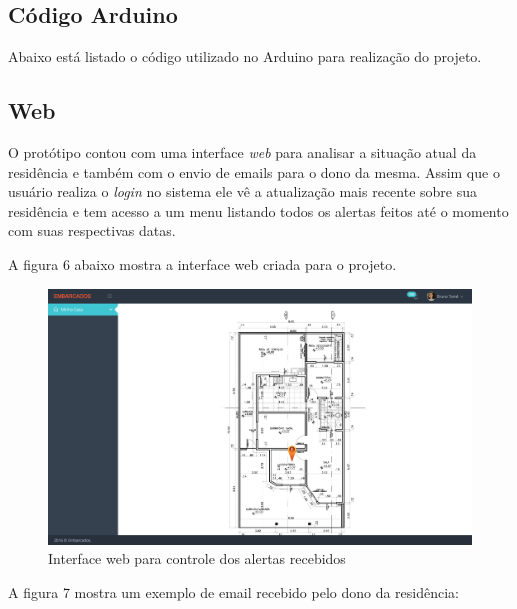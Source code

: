 \documentclass[13pt,a4]{article}
\begin{document}
\subsection{Código Arduino} 

Abaixo está listado o código utilizado no Arduino para realização do projeto.


\subsection{Web}

O protótipo contou com uma interface \textit{web} para analisar a situação atual da residência e também com o envio de emails para o dono da mesma. Assim que o usuário realiza o \textit{login} no sistema ele vê a atualização mais recente sobre sua residência e tem acesso a um menu listando todos os alertas feitos até o momento com suas respectivas datas.

A figura 6 abaixo mostra a interface web criada para o projeto.

\newpage

\begin{figure}[!htb]
	\centering
	\includegraphics[scale=0.30]{web.png}
	\caption{Interface web para controle dos alertas recebidos}
	\label{}
\end{figure}

A figura 7 mostra um exemplo de email recebido pelo dono da residência:
\end{document}
